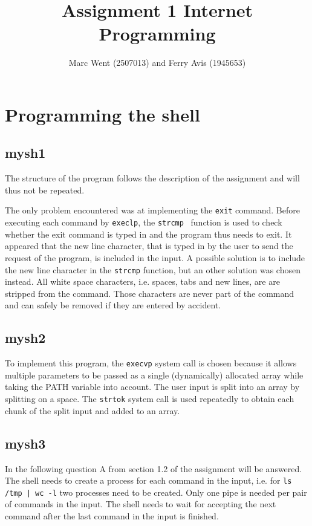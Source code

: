 \documentclass[11pt]{article}
\title{Assignment 1 Internet Programming}
\author{Marc Went (2507013) and Ferry Avis (1945653)}
\begin{document}
\maketitle

\section{Programming the shell}

\subsection{mysh1}

The structure of the program follows the description of the assignment and will thus not be repeated.

The only problem encountered was at implementing the \texttt{exit} command. Before executing each command by \texttt{execlp}, the \texttt{strcmp} \ function is used to check whether the exit command is typed in and the program thus needs to exit. It appeared that the new line character, that is typed in by the user to send the request of the program, is included in the input. A possible solution is to include the new line character in the \texttt{strcmp} function, but an other solution was chosen instead. All white space characters, i.e. spaces, tabs and new lines, are are stripped from 
the command. Those characters are never part of the command and can safely be removed if they are entered by accident.

\subsection{mysh2}

To implement this program, the \texttt{execvp} system call is chosen because it allows multiple parameters to be passed as a single (dynamically) allocated array while taking the PATH variable into account. The user input is split into an array by splitting on a space. The \texttt{strtok} system call is used repeatedly to obtain each chunk of the split input and added to an array.

\subsection{mysh3}

In the following question A from section 1.2 of the assignment will be answered. The shell needs to create a process for each command in the input, i.e. for \texttt{ls /tmp | wc -l} two processes need to be created. Only one pipe is needed per pair of commands in the input. The shell needs to wait for accepting the next command after the last command in the input is finished.
\end{document}
